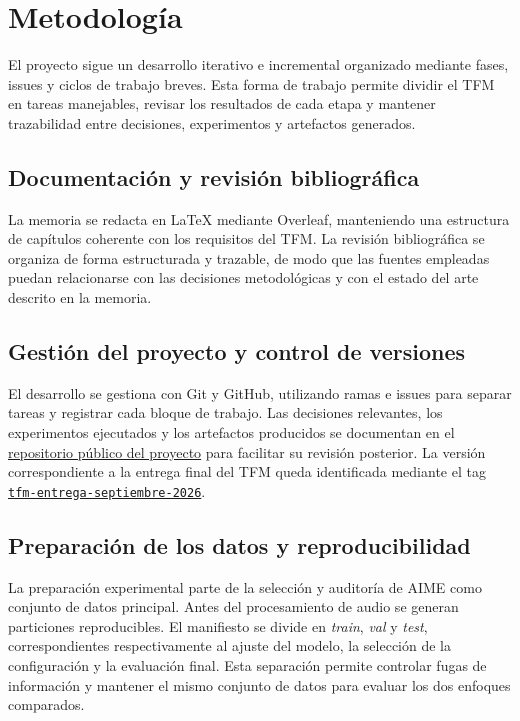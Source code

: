 \section{Metodología}

El proyecto sigue un desarrollo iterativo e incremental organizado mediante fases, issues y ciclos de trabajo breves. Esta forma de trabajo permite dividir el TFM en tareas manejables, revisar los resultados de cada etapa y mantener trazabilidad entre decisiones, experimentos y artefactos generados.

\subsection{Documentación y revisión bibliográfica}

La memoria se redacta en LaTeX mediante Overleaf, manteniendo una estructura de capítulos coherente con los requisitos del TFM. La revisión bibliográfica se organiza de forma estructurada y trazable, de modo que las fuentes empleadas puedan relacionarse con las decisiones metodológicas y con el estado del arte descrito en la memoria.

\subsection{Gestión del proyecto y control de versiones}

El desarrollo se gestiona con Git y GitHub, utilizando ramas e issues para separar tareas y registrar cada bloque de trabajo. Las decisiones relevantes, los experimentos ejecutados y los artefactos producidos se documentan en el \href{https://github.com/sergioapi/tfm-ai-music-detection}{repositorio público del proyecto} para facilitar su revisión posterior. La versión correspondiente a la entrega final del TFM queda identificada mediante el tag \href{https://github.com/sergioapi/tfm-ai-music-detection/tree/tfm-entrega-septiembre-2026}{\texttt{tfm-entrega-septiembre-2026}}.

\subsection{Preparación de los datos y reproducibilidad}

La preparación experimental parte de la selección y auditoría de AIME como conjunto de datos principal. Antes del procesamiento de audio se generan particiones reproducibles. El manifiesto se divide en \textit{train}, \textit{val} y \textit{test}, correspondientes respectivamente al ajuste del modelo, la selección de la configuración y la evaluación final. Esta separación permite controlar fugas de información y mantener el mismo conjunto de datos para evaluar los dos enfoques comparados.

